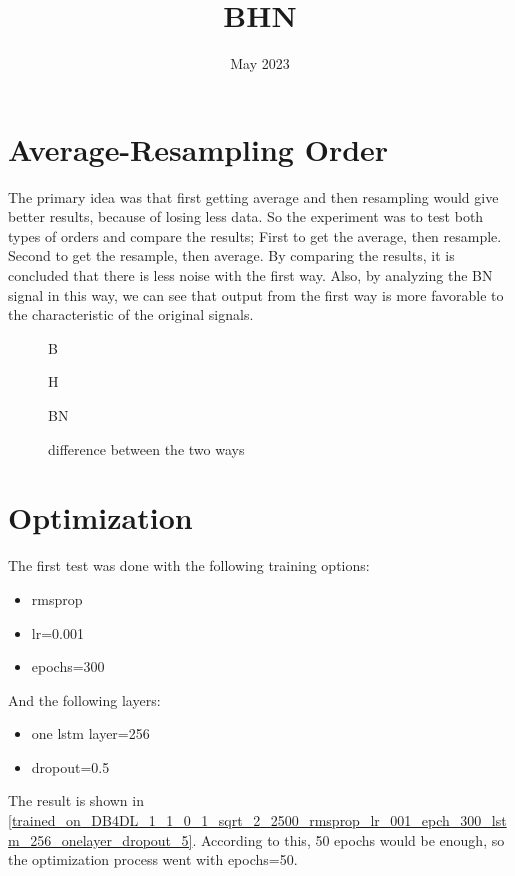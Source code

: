 \documentclass{article}
\title{BHN}
\date{May 2023}
\begin{document}
\maketitle

\section{Average-Resampling Order}

The primary idea was that first getting average and then resampling would give better results, because of losing less data. So the experiment was to test both types of orders and compare the results; First to get the average, then resample. Second to get the resample, then average.
By comparing the results, it is concluded that there is less noise with the first way. Also, by analyzing the BN signal in this way, we can see that output from the first way is more favorable to the characteristic of the original signals.

\bigskip
\begin{figure}[H]
\centering

\caption{B}
\end{figure}

\begin{figure}[H]
\centering

\caption{H}
\end{figure}

\begin{figure}[H]
\centering

\caption{BN}
\end{figure}

\begin{figure}[H]
\centering

\caption{difference between the two ways}
\end{figure}

\bigskip
\section{Optimization}

The first test was done with the following training options:
\begin{itemize}
    \item rmsprop
    \item lr=0.001 
    \item epochs=300
\end{itemize}
And the following layers:
\begin{itemize}
    \item one lstm layer=256
    \item dropout=0.5
\end{itemize}
The result is shown in \figurename{\ref{trained_on_DB4DL_1_1_0_1_sqrt_2_2500_rmsprop_lr_001_epch_300_lstm_256_onelayer_dropout_5}}. According to this, 50 epochs would be enough, so the optimization process went with epochs=50. 
\end{document}
